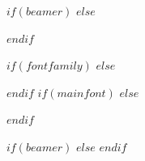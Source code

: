 %
%
$if(beamer)$
$else$
\usepackage[font={stretch=1.2}, textfont={color=caption-color}, position=top, skip=4mm, labelfont=bf, singlelinecheck=true, justification=$if(caption-justification)$$caption-justification$$else$raggedright$endif$]{caption}
\setcapindent{0em}
$endif$


%
%
%
\fi{} %
  $if(fontfamily)$
  $else$
  \usepackage[default, lining]{sourcesanspro}
  \usepackage[scaled=1.05]{beramono}
  $endif$
\else %
  $if(mainfont)$
  $else$
  

  \usepackage[default, lining]{sourcesanspro}
  

  \usepackage[nomap, lining, medium, scaled=1.1]{FiraMono} 
  \usepackage{fontawesome5}


  $endif$
\fi

%
%
$if(beamer)$
$else$
$endif$

